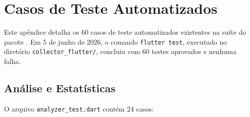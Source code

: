 \chapter{Casos de Teste Automatizados}
\label{ap:testes}

Este apêndice detalha os 60 casos de teste automatizados existentes na suíte do pacote \collectorFlutter{}.
Em 5 de junho de 2026, o comando \texttt{flutter test}, executado no diretório \texttt{collector\_flutter/}, concluiu com 60 testes aprovados e nenhuma falha.

\section{Análise e Estatísticas}

O arquivo \texttt{analyzer\_test.dart} contém 24 casos:

